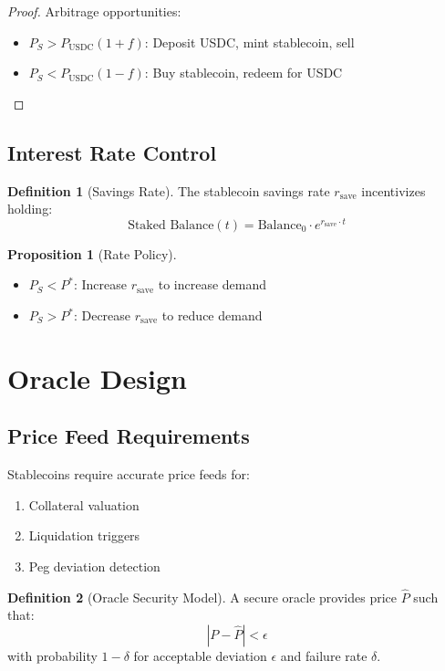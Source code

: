 \documentclass[11pt,a4paper]{article}
\theoremstyle{definition}
\newtheorem{definition}{Definition}
\newtheorem{proposition}{Proposition}
\begin{document}
\begin{proof}
Arbitrage opportunities:
\begin{itemize}
\item $P_S > P_{\text{USDC}}(1 + f)$: Deposit USDC, mint stablecoin, sell
\item $P_S < P_{\text{USDC}}(1 - f)$: Buy stablecoin, redeem for USDC
\end{itemize}
\end{proof}

\subsection{Interest Rate Control}

\begin{definition}[Savings Rate]
The stablecoin savings rate $r_{\text{save}}$ incentivizes holding:
\begin{equation}
\text{Staked Balance}(t) = \text{Balance}_0 \cdot e^{r_{\text{save}} \cdot t}
\end{equation}
\end{definition}

\begin{proposition}[Rate Policy]
\begin{itemize}
\item $P_S < P^*$: Increase $r_{\text{save}}$ to increase demand
\item $P_S > P^*$: Decrease $r_{\text{save}}$ to reduce demand
\end{itemize}
\end{proposition}

\section{Oracle Design}

\subsection{Price Feed Requirements}

Stablecoins require accurate price feeds for:
\begin{enumerate}
\item Collateral valuation
\item Liquidation triggers
\item Peg deviation detection
\end{enumerate}

\begin{definition}[Oracle Security Model]
A secure oracle provides price $\hat{P}$ such that:
\begin{equation}
|P - \hat{P}| < \epsilon
\end{equation}
with probability $1 - \delta$ for acceptable deviation $\epsilon$ and failure rate $\delta$.
\end{definition}
\end{document}
